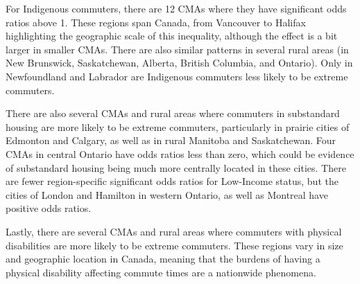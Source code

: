 \documentclass[10 pt,letterpaper]{article}
\begin{document}
For Indigenous commuters, there are 12 CMAs where they have significant odds ratios above 1. These regions span Canada, from Vancouver to Halifax highlighting the geographic scale of this inequality, although the effect is a bit larger in smaller CMAs. There are also similar patterns in several rural areas (in New Brunswick, Saskatchewan, Alberta, British Columbia, and Ontario). Only in Newfoundland and Labrador are Indigenous commuters less likely to be extreme commuters.

There are also several CMAs and rural areas where commuters in substandard housing are more likely to be extreme commuters, particularly in prairie cities of Edmonton and Calgary, as well as in rural Manitoba and Saskatchewan. Four CMAs in central Ontario have odds ratios less than zero, which could be evidence of substandard housing being much more centrally located in these cities. There are fewer region-specific significant odds ratios for Low-Income status, but the cities of London and Hamilton in western Ontario, as well as Montreal have positive odds ratios.

Lastly, there are several CMAs and rural areas where commuters with physical disabilities are more likely to be extreme commuters. These regions vary in size and geographic location in Canada, meaning that the burdens of having a physical disability affecting commute times are a nationwide phenomena. 
\end{document}
